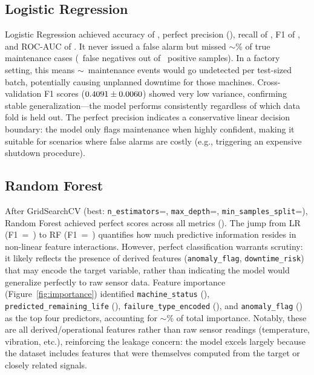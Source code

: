 \documentclass[11pt]{article}
\begin{document}
\subsection{Logistic Regression}

Logistic Regression achieved accuracy of \lrAcc, perfect precision (\lrPrec), recall of \lrRec, F1 of \lrFone, and ROC-AUC of \lrAuc. It never issued a false alarm but missed $\sim$\lrMissPct\% of true maintenance cases (\lrFN\ false negatives out of \lrTotalPos\ positive samples). In a factory setting, this means $\sim$\lrFN\ maintenance events would go undetected per test-sized batch, potentially causing unplanned downtime for those machines. Cross-validation F1 scores ($0.4091 \pm 0.0060$) showed very low variance, confirming stable generalization---the model performs consistently regardless of which data fold is held out. The perfect precision indicates a conservative linear decision boundary: the model only flags maintenance when highly confident, making it suitable for scenarios where false alarms are costly (e.g., triggering an expensive shutdown procedure).

\subsection{Random Forest}

After GridSearchCV (best: \texttt{n\_estimators}=\rfBestEst, \texttt{max\_depth}=\rfBestDepth, \texttt{min\_samples\_split}=\rfBestSplit), Random Forest achieved perfect scores across all metrics (\rfFone). The jump from LR (F1~=~\lrFone) to RF (F1~=~\rfFone) quantifies how much predictive information resides in non-linear feature interactions. However, perfect classification warrants scrutiny: it likely reflects the presence of derived features (\texttt{anomaly\_flag}, \texttt{downtime\_risk}) that may encode the target variable, rather than indicating the model would generalize perfectly to raw sensor data. Feature importance (Figure~\ref{fig:importance}) identified \texttt{machine\_status} (\rfImpA), \texttt{predicted\_remaining\_life} (\rfImpB), \texttt{failure\_type\_encoded} (\rfImpC), and \texttt{anomaly\_flag} (\rfImpD) as the top four predictors, accounting for $\sim$\rfTopFourPct\% of total importance. Notably, these are all derived/operational features rather than raw sensor readings (temperature, vibration, etc.), reinforcing the leakage concern: the model excels largely because the dataset includes features that were themselves computed from the target or closely related signals.
\end{document}
